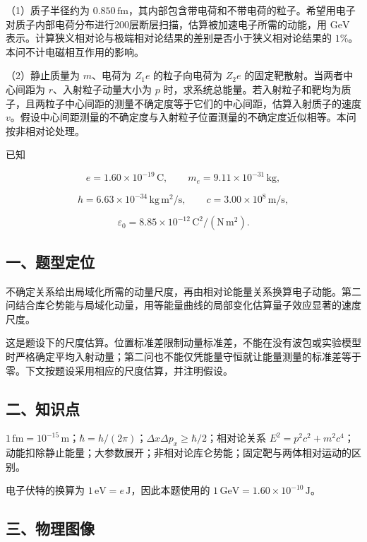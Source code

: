 \documentclass[12pt,a4paper,fontset=fandol]{ctexart}
\begin{document}
（1）质子半径约为
\(0.850\,\mathrm{fm}\)，其内部包含带电荷和不带电荷的粒子。希望用电子对质子内部电荷分布进行200层断层扫描，估算被加速电子所需的动能，用
\(\mathrm{GeV}\)
表示。计算狭义相对论与极端相对论结果的差别是否小于狭义相对论结果的
\(1\%\)。本问不计电磁相互作用的影响。

（2）静止质量为 \(m\)、电荷为 \(Z_1e\) 的粒子向电荷为 \(Z_2e\)
的固定靶散射。当两者中心间距为 \(r\)、入射粒子动量大小为 \(p\)
时，求系统总能量。若入射粒子和靶均为质子，且两粒子中心间距的测量不确定度等于它们的中心间距，估算入射质子的速度
\(v\)。假设中心间距测量的不确定度与入射粒子位置测量的不确定度近似相等。本问按非相对论处理。

已知

\[e=1.60\times10^{-19}\,\mathrm C,
\qquad m_e=9.11\times10^{-31}\,\mathrm{kg},\]

\[h=6.63\times10^{-34}\,\mathrm{kg\,m^2/s},
\qquad c=3.00\times10^8\,\mathrm{m/s},\]

\[\varepsilon_0=8.85\times10^{-12}\,\mathrm{C^2/(N\,m^2)}.\]

\subsection{一、题型定位}\label{ux4e00ux9898ux578bux5b9aux4f4d-3}

不确定关系给出局域化所需的动量尺度，再由相对论能量关系换算电子动能。第二问结合库仑势能与局域化动量，用等能量曲线的局部变化估算量子效应显著的速度尺度。

这是题设下的尺度估算。位置标准差限制动量标准差，不能在没有波包或实验模型时严格确定平均入射动量；第二问也不能仅凭能量守恒就让能量测量的标准差等于零。下文按题设采用相应的尺度估算，并注明假设。

\subsection{二、知识点}\label{ux4e8cux77e5ux8bc6ux70b9-3}

\(1\,\mathrm{fm}=10^{-15}\,\mathrm m\)；\(\hbar=h/(2\pi)\)；\(\Delta x\Delta p_x\ge\hbar/2\)；相对论关系
\(E^2=p^2c^2+m^2c^4\)；动能扣除静止能量；大参数展开；非相对论库仑势能；固定靶与两体相对运动的区别。

电子伏特的换算为 \(1\,\mathrm{eV}=e\,\mathrm J\)，因此本题使用的
\(1\,\mathrm{GeV}=1.60\times10^{-10}\,\mathrm J\)。

\subsection{三、物理图像}\label{ux4e09ux7269ux7406ux56feux50cf-3}
\end{document}
